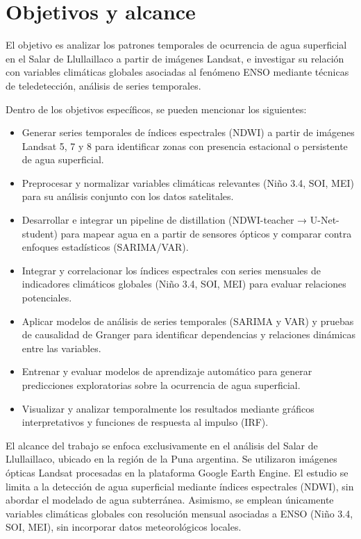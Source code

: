 
\section{Objetivos y alcance}

El objetivo es analizar los patrones temporales de ocurrencia de agua superficial en el Salar de Llullaillaco a partir de imágenes Landsat, e investigar su relación con variables climáticas globales asociadas al fenómeno ENSO mediante técnicas de teledetección, análisis de series temporales.

Dentro de los objetivos específicos, se pueden mencionar los siguientes:

\begin{itemize}
    \item Generar series temporales de índices espectrales (NDWI) a partir de imágenes Landsat 5, 7 y 8 para identificar zonas con presencia estacional o persistente de agua superficial.
    \item Preprocesar y normalizar variables climáticas relevantes (Niño 3.4, SOI, MEI) para su análisis conjunto con los datos satelitales.
    \item Desarrollar e integrar un pipeline de distillation (NDWI-teacher → U-Net-student) para mapear agua en  a partir de sensores ópticos y comparar contra enfoques estadísticos (SARIMA/VAR).
    \item Integrar y correlacionar los índices espectrales con series mensuales de indicadores climáticos globales (Niño 3.4, SOI, MEI) para evaluar relaciones potenciales.
    \item Aplicar modelos de análisis de series temporales (SARIMA y VAR) y pruebas de causalidad de Granger para identificar dependencias y relaciones dinámicas entre las variables.
    \item Entrenar y evaluar modelos de aprendizaje automático para generar predicciones exploratorias sobre la ocurrencia de agua superficial.
    \item Visualizar y analizar temporalmente los resultados mediante gráficos interpretativos y funciones de respuesta al impulso (IRF).
\end{itemize}

El alcance del trabajo se enfoca exclusivamente en el análisis del Salar de Llullaillaco, ubicado en la región de la Puna argentina. Se utilizaron imágenes ópticas Landsat procesadas en la plataforma Google Earth Engine. El estudio se limita a la detección de agua superficial mediante índices espectrales (NDWI), sin abordar el modelado de agua subterránea. Asimismo, se emplean únicamente variables climáticas globales con resolución mensual asociadas a ENSO (Niño 3.4, SOI, MEI), sin incorporar datos meteorológicos locales.


